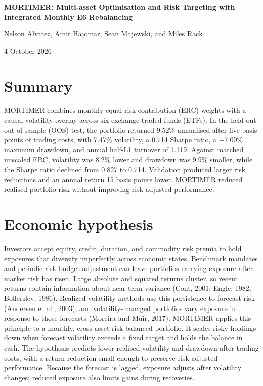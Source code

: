 \documentclass[11pt,letterpaper]{article}
\begin{document}
\hypersetup{pageanchor=false}
\begin{titlepage}
\centering
\vspace*{\fill}
{\LARGE\bfseries MORTIMER: Multi-asset Optimisation and Risk Targeting with Integrated Monthly E6 Rebalancing\par}
\vspace{2cm}
{\large Nelson Alvarez, Amir Hajomar, Sean Majewski, and Miles Rack\par}
\vspace{0.75cm}
{4 October 2026\par}
\vspace*{\fill}
\end{titlepage}
\hypersetup{pageanchor=true}
\newpage
\section*{Summary}
MORTIMER combines monthly equal-risk-contribution (ERC) weights with a causal volatility overlay across six exchange-traded funds (ETFs). In the held-out out-of-sample (OOS) test, the portfolio returned 9.52\% annualised after five basis points of trading costs, with 7.47\% volatility, a 0.714 Sharpe ratio, a $-7.00$\% maximum drawdown, and annual half-L1 turnover of 1.119. Against matched unscaled ERC, volatility was 8.2\% lower and drawdown was 9.9\% smaller, while the Sharpe ratio declined from 0.827 to 0.714. Validation produced larger risk reductions and an annual return 15 basis points lower. MORTIMER reduced realised portfolio risk without improving risk-adjusted performance.

\section*{Economic hypothesis}
Investors accept equity, credit, duration, and commodity risk premia to hold exposures that diversify imperfectly across economic states. Benchmark mandates and periodic risk-budget adjustment can leave portfolios carrying exposure after market risk has risen. Large absolute and squared returns cluster, so recent returns contain information about near-term variance (Cont, 2001; Engle, 1982; Bollerslev, 1986). Realized-volatility methods use this persistence to forecast risk (Andersen et al., 2003), and volatility-managed portfolios vary exposure in response to those forecasts (Moreira and Muir, 2017). MORTIMER applies this principle to a monthly, cross-asset risk-balanced portfolio. It scales risky holdings down when forecast volatility exceeds a fixed target and holds the balance in cash. The hypothesis predicts lower realised volatility and drawdown after trading costs, with a return reduction small enough to preserve risk-adjusted performance. Because the forecast is lagged, exposure adjusts after volatility changes; reduced exposure also limits gains during recoveries.
\end{document}
